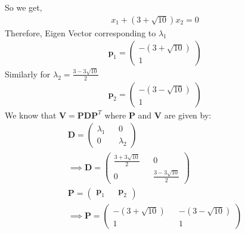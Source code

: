 \documentclass[journal,13pt,twocolumn]{IEEEtran}
\newcommand{\myvec}[1]{\ensuremath{\begin{pmatrix}#1\end{pmatrix}}}
\renewcommand{\vec}[1]{\mathbf{#1}}
\begin{document}
So we get,
\begin{align}
x_1 + (3+\sqrt{10})x_2 = 0
\end{align}
Therefore, Eigen Vector corresponding to $\lambda_1$
\begin{align}
\vec{p}_1 = \myvec{-(3+\sqrt{10}) \\ 1}
\end{align}
Similarly for $\lambda_2 = \frac{3-3\sqrt{10}}{2}$
\begin{align}
\vec{p}_2 = \myvec{-(3-\sqrt{10}) \\ 1}
\end{align}
We know that $\vec{V} = \vec{P}\vec{D}\vec{P}^T$ where $\vec{P}$ and $\vec{V}$ are given by:
\begin{align}
\vec{D} = \myvec{\lambda_1 && 0\\ 0 && \lambda_2}\\
\implies \vec{D} = \myvec{\frac{3+3\sqrt{10}}{2} && 0\\ 0 &&\frac{3-3\sqrt{10}}{2} }\\
\vec{P} = \myvec{\vec{p}_1 && \vec{p}_2}\\
\implies \vec{P} = \myvec{-(3+\sqrt{10}) && -(3-\sqrt{10}) \\ 1 && 1}
\end{align}
\end{document}
